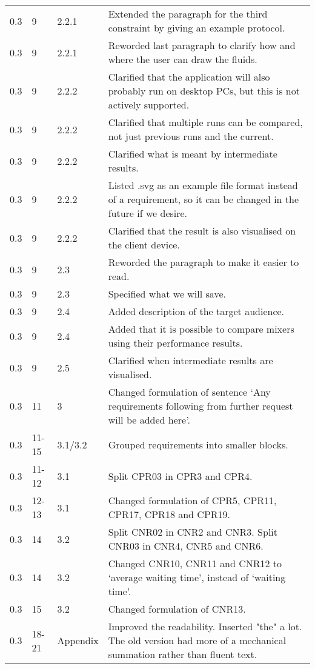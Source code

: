 \begin{longtable}{|l|l|l|p{11cm}|}
    0.3 & 9 & 2.2.1 & Extended the paragraph for the third constraint by giving an example protocol. \\
    0.3 & 9 & 2.2.1 & Reworded last paragraph to clarify how and where the user can draw the fluids. \\
    0.3 & 9 & 2.2.2 & Clarified that the application will also probably run on desktop PCs, but this is not actively supported. \\
    0.3 & 9 & 2.2.2 & Clarified that multiple runs can be compared, not just previous runs and the current.\\
    0.3 & 9 & 2.2.2 & Clarified what is meant by intermediate results. \\
    0.3 & 9 & 2.2.2 & Listed .svg as an example file format instead of a requirement, so it can be changed in the future if we desire. \\
    0.3 & 9 & 2.2.2 & Clarified that the result is also visualised on the client device. \\
    0.3 & 9 & 2.3 & Reworded the paragraph to make it easier to read. \\
    0.3 & 9 & 2.3 & Specified what we will save. \\
    0.3 & 9 & 2.4 & Added description of the target audience. \\
    0.3 & 9 & 2.4 & Added that it is possible to compare mixers using their performance results. \\
    0.3 & 9 & 2.5 & Clarified when intermediate results are visualised. \\
    0.3 & 11 & 3 & Changed formulation of sentence `Any requirements following from further request will be added here'.\\
    0.3 & 11-15 & 3.1/3.2 & Grouped requirements into smaller blocks.\\
    0.3 & 11-12 & 3.1 & Split CPR03 in CPR3 and CPR4.\\
    0.3 & 12-13 & 3.1 & Changed formulation of CPR5, CPR11, CPR17, CPR18 and CPR19.\\
    0.3 & 14 & 3.2 & Split CNR02 in CNR2 and CNR3. Split CNR03 in CNR4, CNR5 and CNR6.\\
    0.3 & 14 & 3.2 & Changed CNR10, CNR11 and CNR12 to `average waiting time', instead of `waiting time'.\\
    0.3 & 15 & 3.2 & Changed formulation of CNR13.\\
    0.3 & 18-21 & Appendix & Improved the readability. Inserted "the" a lot. The old version had more of a mechanical summation rather than fluent text.\\

\end{longtable}
